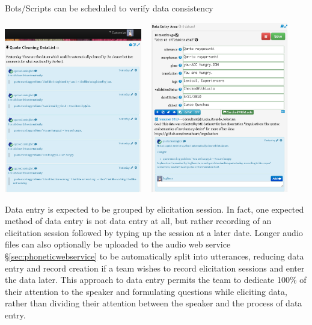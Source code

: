 \documentclass[letterpaper, 12pt, dvips]{mitwpl}
\begin{document}
\begin{exe} 
\ex Bots/Scripts can be scheduled to verify data consistency

\hspace{-1in}
 \centering
   \includegraphics[width=0.45\textwidth]{cleaningBotsDatalist} ~
   \includegraphics[width=0.45\textwidth]{cleaningBotCameBy}

\label{ex:bots}
\end{exe}



Data entry is expected to be grouped by elicitation session.
In fact,
one expected method of data entry is not data entry at all,
but rather recording of an elicitation session followed by typing up the session at a later date.
Longer audio files can also optionally be uploaded to the audio web service \S \ref{sec:phoneticwebservice} to be automatically split into utterances,
 reducing data entry and record creation if a team wishes to record elicitation sessions and enter the data later.
 This approach to data entry permits the team to dedicate 100\% of their attention to the speaker and formulating questions while eliciting data,
rather than dividing their attention between the speaker and the process of data entry.
\end{document}

